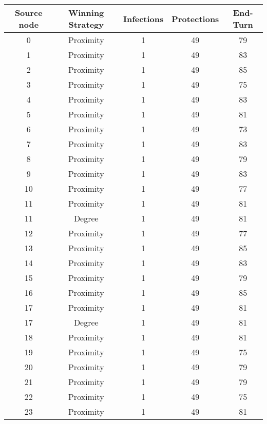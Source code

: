 \documentclass[results.tex]{subfiles}
\begin{document}
\begin{center}
  \begin{tabular}{| c || c | c | c | c |}
    \hline
    {\bfseries Source node} & {\bfseries Winning Strategy} & {\bfseries Infections} & {\bfseries Protections} & {\bfseries End-Turn} \\  %
    \hline\hline
    0 & Proximity & 1 & 49 & 79 \\ 
    \hline
    1 & Proximity & 1 & 49 & 83 \\ 
    \hline
    2 & Proximity & 1 & 49 & 85 \\ 
    \hline
    3 & Proximity & 1 & 49 & 75 \\ 
    \hline
    4 & Proximity & 1 & 49 & 83 \\ 
    \hline
    5 & Proximity & 1 & 49 & 81 \\ 
    \hline
    6 & Proximity & 1 & 49 & 73 \\ 
    \hline
    7 & Proximity & 1 & 49 & 83 \\ 
    \hline
    8 & Proximity & 1 & 49 & 79 \\ 
    \hline
    9 & Proximity & 1 & 49 & 83 \\ 
    \hline
    10 & Proximity & 1 & 49 & 77 \\ 
    \hline
    11 & Proximity & 1 & 49 & 81 \\ 
    \hline
    11 & Degree & 1 & 49 & 81 \\ 
    \hline
    12 & Proximity & 1 & 49 & 77 \\ 
    \hline
    13 & Proximity & 1 & 49 & 85 \\ 
    \hline
    14 & Proximity & 1 & 49 & 83 \\ 
    \hline
    15 & Proximity & 1 & 49 & 79 \\ 
    \hline
    16 & Proximity & 1 & 49 & 85 \\ 
    \hline
    17 & Proximity & 1 & 49 & 81 \\ 
    \hline
    17 & Degree & 1 & 49 & 81 \\ 
    \hline
    18 & Proximity & 1 & 49 & 81 \\ 
    \hline
    19 & Proximity & 1 & 49 & 75 \\ 
    \hline
    20 & Proximity & 1 & 49 & 79 \\ 
    \hline
    21 & Proximity & 1 & 49 & 79 \\ 
    \hline
    22 & Proximity & 1 & 49 & 75 \\ 
    \hline
    23 & Proximity & 1 & 49 & 81 \\ 

\end{tabular}
\end{center}
\end{document}
